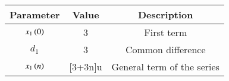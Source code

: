 \begin{tabular}{|c|c|c|}
	\hline
	\textbf{Parameter} & \textbf{Value} & \textbf{Description} \\
	\hline
	$ x_1\left(0\right)$ & 3 & First term \\
	\hline
	$ d_1$ & 3 & Common difference \\
	\hline
	$ x_1\left(n\right)$ & [3+3n]u\brak{n} & General term of the series  \\
	\hline
\end{tabular}